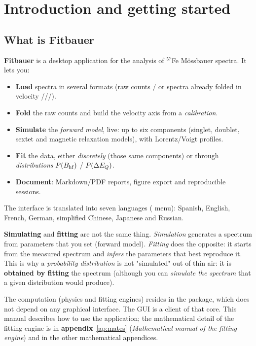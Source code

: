 \chapter{Introduction and getting started}
\label{ch:intro}

\section{What is Fitbauer}

\textbf{Fitbauer} is a desktop application for the analysis of $^{57}$Fe
Mössbauer spectra. It lets you:

\begin{itemize}[nosep]
  \item \textbf{Load} spectra in several formats (raw counts
        / or spectra already folded in velocity
        ///).
  \item \textbf{Fold} the raw counts and build the velocity
        axis from a \emph{calibration}.
  \item \textbf{Simulate} the \emph{forward model}, live: up to six components
        (singlet, doublet, sextet and magnetic relaxation models), with
        Lorentz/Voigt profiles.
  \item \textbf{Fit} the data, either \emph{discretely} (those same
        components) or through \emph{distributions} $P(B_{\mathrm{hf}})$ / $P(\Delta E_{Q})$.
  \item \textbf{Document}: Markdown/PDF reports, figure export and
        reproducible sessions.
\end{itemize}

The interface is translated into seven languages ( menu): Spanish, English,
French, German, simplified Chinese, Japanese and Russian.

\begin{nota}
\textbf{Simulating} and \textbf{fitting} are not the same thing. \emph{Simulation} generates
a spectrum from parameters that you set (forward model). \emph{Fitting}
does the opposite: it starts from the measured spectrum and \emph{infers} the parameters that
best reproduce it. This is why a \emph{probability distribution} is not
"simulated" out of thin air: it is \textbf{obtained by fitting} the spectrum (although you can
\emph{simulate the spectrum} that a given distribution would produce).
\end{nota}

\begin{nota}
The computation (physics and fitting engines) resides in the  package, which
does not depend on any graphical interface. The GUI is a client of that core. This
manual describes how to use the application; the mathematical detail of the fitting
engine is in \textbf{appendix}~\ref{ap:mates} (\emph{Mathematical manual of the fitting
engine}) and in the other mathematical appendices.
\end{nota}


